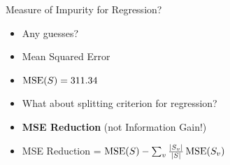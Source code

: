 \documentclass[usenames,dvipsnames]{beamer}
\begin{document}
\begin{frame}{Measure of Impurity for Regression?}
\begin{itemize}
	\item \pause Any guesses?
	\item \pause Mean Squared Error
	\item \pause $\operatorname{MSE}(S) = 311.34$
	\item \pause What about splitting criterion for regression?
	\item \pause \textbf{MSE Reduction} (not Information Gain!)
	\item \pause MSE Reduction = $\operatorname{MSE}(S) - \sum_{v} \frac{|S_v|}{|S|} \operatorname{MSE}(S_v)$
\end{itemize}

\end{frame}
\end{document}
